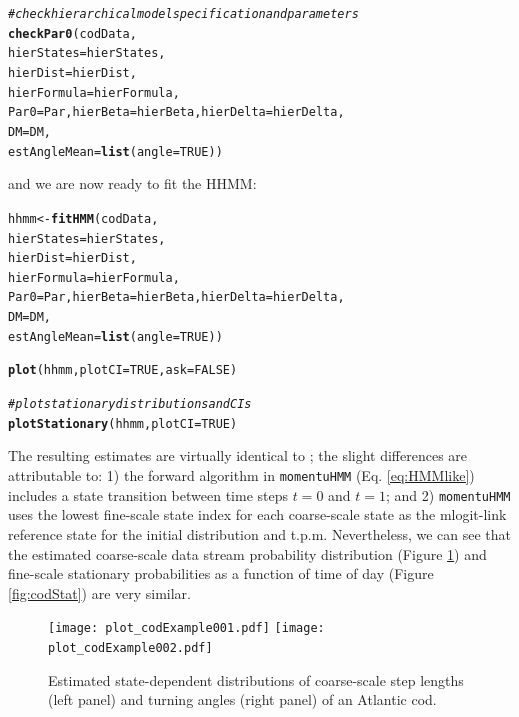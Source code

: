 \documentclass[12pt]{article}\usepackage[]{graphicx}\usepackage[]{xcolor}
\makeatletter
\newcommand{\hlnum}[1]{\textcolor[rgb]{0.686,0.059,0.569}{#1}}%
\newcommand{\hlcom}[1]{\textcolor[rgb]{0.678,0.584,0.686}{\textit{#1}}}%
\newcommand{\hldef}[1]{\textcolor[rgb]{0.345,0.345,0.345}{#1}}%
\newcommand{\hlkwb}[1]{\textcolor[rgb]{0.69,0.353,0.396}{#1}}%
\newcommand{\hlkwc}[1]{\textcolor[rgb]{0.333,0.667,0.333}{#1}}%
\newcommand{\hlkwd}[1]{\textcolor[rgb]{0.737,0.353,0.396}{\textbf{#1}}}%
\newenvironment{kframe}{%
 \def\at@end@of@kframe{}%
 \ifinner\ifhmode%
  \def\at@end@of@kframe{\end{minipage}}%
  \begin{minipage}{\columnwidth}%
 \fi\fi%
 \def\FrameCommand##1{\hskip\@totalleftmargin \hskip-\fboxsep
 \colorbox{shadecolor}{##1}\hskip-\fboxsep
     \hskip-\linewidth \hskip-\@totalleftmargin \hskip\columnwidth}%
 \MakeFramed {\advance\hsize-\width
   \@totalleftmargin\z@ \linewidth\hsize
   \@setminipage}}%
 {\par\unskip\endMakeFramed%
 \at@end@of@kframe}
\newenvironment{knitrout}{}{} %
\let\hlstd\hldef
\makeatother
\begin{document}
\begin{knitrout}
\begin{kframe}
\begin{alltt}
\hlcom{# check hierarchical model specification and parameters}
\hlkwd{checkPar0}\hlstd{(codData,}
          \hlkwc{hierStates} \hlstd{= hierStates,}
          \hlkwc{hierDist} \hlstd{= hierDist,}
          \hlkwc{hierFormula} \hlstd{= hierFormula,}
          \hlkwc{Par0} \hlstd{= Par,} \hlkwc{hierBeta} \hlstd{= hierBeta,} \hlkwc{hierDelta} \hlstd{= hierDelta,}
          \hlkwc{DM} \hlstd{= DM,}
          \hlkwc{estAngleMean} \hlstd{=} \hlkwd{list}\hlstd{(}\hlkwc{angle}\hlstd{=}\hlnum{TRUE}\hlstd{))}
\end{alltt}
\end{kframe}
\end{knitrout}
\noindent and we are now ready to fit the HHMM:

\begin{knitrout}
\color{fgcolor}\begin{kframe}
\begin{alltt}
\hldef{hhmm} \hlkwb{<-} \hlkwd{fitHMM}\hldef{(codData,}
               \hlkwc{hierStates} \hldef{= hierStates,}
               \hlkwc{hierDist} \hldef{= hierDist,}
               \hlkwc{hierFormula} \hldef{= hierFormula,}
               \hlkwc{Par0} \hldef{= Par,} \hlkwc{hierBeta} \hldef{= hierBeta,} \hlkwc{hierDelta} \hldef{= hierDelta,}
               \hlkwc{DM} \hldef{= DM,}
               \hlkwc{estAngleMean} \hldef{=} \hlkwd{list}\hldef{(}\hlkwc{angle}\hldef{=}\hlnum{TRUE}\hldef{))}

\hlkwd{plot}\hldef{(hhmm,} \hlkwc{plotCI}\hldef{=}\hlnum{TRUE}\hldef{,} \hlkwc{ask}\hldef{=}\hlnum{FALSE}\hldef{)}

\hlcom{# plot stationary distributions and CIs}
\hlkwd{plotStationary}\hldef{(hhmm,} \hlkwc{plotCI}\hldef{=}\hlnum{TRUE}\hldef{)}
\end{alltt}
\end{kframe}
\end{knitrout}
The resulting estimates are virtually identical to \cite{AdamEtAl2019}; the slight differences are attributable to: 1) the forward algorithm in \verb|momentuHMM| (Eq. \ref{eq:HMMlike}) includes a state transition between time steps $t=0$ and $t=1$; and 2) \verb|momentuHMM| uses the lowest fine-scale state index for each coarse-scale state as the mlogit-link reference state for the initial distribution and t.p.m.%
Nevertheless, we can see that the estimated coarse-scale data stream probability distribution (Figure \ref{fig:codDists}) and fine-scale stationary probabilities as a function of time of day (Figure \ref{fig:codStat}) are very similar.
\begin{figure}[htbp]
  \centering
  \texttt{[image: plot\_codExample001.pdf]}
  \texttt{[image: plot\_codExample002.pdf]}
  \caption{Estimated state-dependent distributions of coarse-scale step lengths (left panel) and turning angles (right panel) of an Atlantic
cod.}
  \label{fig:codDists}
\end{figure}
\end{document}
